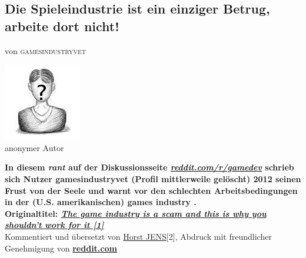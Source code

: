 \documentclass[10pt,a4paper,ngerman,twoside]{article} %
\newcommand{\NewsItem}[1]{ %
\usefont{T1}{fvs}{n}{n} %
\vspace{24pt}\large #1\vspace{3pt} %
\par \normalsize \normalfont}
\newcommand{\NewsAuthor}[1]{ %
\hfill von \textsc{#1} \vspace{20pt} %
\par \normalfont}
\begin{document}
\begin{multicols}{3}
\NewsItem{}
\section*{Die Spieleindustrie ist ein einziger Betrug, arbeite dort nicht!}
\label{redditrant}
\NewsAuthor{gamesindustryvet}

\begin{center}
\includegraphics[width=0.8\linewidth]{redditrant/redditrant-nobody.jpg} \\ %
\footnotesize{anonymer Autor}
\end{center}

\textbf{In diesem \textit{rant} auf der Diskussionsseite \href{http://reddit.com/r/gamedev}{\textit{reddit.com/r/gamedev}} schrieb sich Nutzer 
\glqq
gamesindustryvet
\grqq (Profil mittlerweile gelöscht) 
2012 seinen Frust von der Seele und warnt vor den schlechten Arbeitsbedingungen in der
(U.S. amerikanischen) 
\glqq 
games industry
\grqq 
. \\ Originaltitel: \href{http://www.reddit.com/r/gamedev/comments/z83h2/the_games_industry_is_a_scam_and_this_is_why_you}{\textit{The game industry is a scam and this is why you shouldn't work for it [1]}}} \\

Kommentiert und übersetzt von \href{http://spielend-programmieren.at}{Horst JENS}[2], Abdruck mit freundlicher Genehmigung von \href{http://reddit.com}{\textbf{reddit.com}} \\


\end{multicols}
\end{document}
